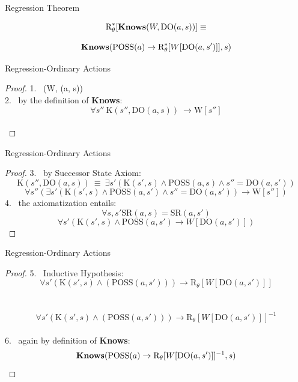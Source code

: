 \begin{frame}{Regression Theorem}
    \begin{theorem}
        \[ \text{R}^*_{\theta}[\textbf{Knows}(W, \text{DO}(a, s))] \equiv \]
            
        \[ \textbf{Knows}(\text{POSS}(a) \rightarrow \text{R}^*_{\theta}[W[\text{DO}(a, s')]], s) \]
    \end{theorem}    
\end{frame}

\begin{frame}{Regression-Ordinary Actions}
    \begin{proof}  
       1. \ \knows(W, (a, s)) \\
       2. \ by the definition of \textbf{Knows}: \ \[ \forall s'' \  \text{K}(s'', \text{DO}(a, s)) \ \rightarrow \text{W}[s''] \] \\
    \end{proof} 
\end{frame} 

\begin{frame}{Regression-Ordinary Actions}
    \begin{proof}  
       3. \ by Successor State Axiom: \[ \text{K}(s'', \text{DO}(a, s)) \ \equiv \ \exists s'(\text{K}(s',s) \land \text{POSS}(a, s) \land s'' = \text{DO}(a, s'))\]
          \[ \forall s''(\exists s'(\text{K}(s',s) \land \text{POSS}(a, s') \land s'' = \text{DO}(a, s')) \rightarrow \text{W}[s''])  \]
       4. \ the axiomatization entails: \[ \forall s,s' \text{SR}(a, s) = \text{SR}(a, s') \] 
          \[ \forall s'(\text{K}(s',s) \land \text{POSS}(a, s') \rightarrow W[\text{DO}(a, s')]) \]
    \end{proof}
\end{frame}

\begin{frame}{Regression-Ordinary Actions}

    \begin{proof}  
       5. \ Inductive Hypothesis: \[ \forall s'(\text{K}(s',s) \land (\text{POSS}(a, s'))) \rightarrow \text{R}_{\theta}[W[\text{DO}(a, s')]] \] \\
          \ \[ \forall s'(\text{K}(s',s) \land (\text{POSS}(a, s'))) \rightarrow \text{R}_{\theta}[W[\text{DO}(a, s')]]^{-1} \] \\
       
       6. \ again by definition of \textbf{Knows}: \  \[ \textbf{Knows}(\text{POSS}(a) \rightarrow \text{R}_{\theta}[W[\text{DO}(a, s')]]^{-1}, s) \]
    \end{proof} 

\end{frame}



